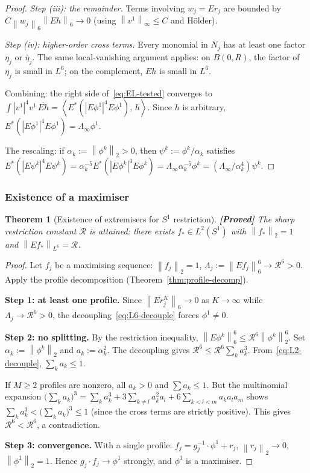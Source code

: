 \documentclass[12pt]{article}
\newtheorem{theorem}{Theorem}[section]
\theoremstyle{definition}
\theoremstyle{remark}
\newcommand{\norm}[1]{\left\|#1\right\|}
\newcommand{\ip}[2]{\left\langle #1,\, #2\right\rangle}
\newcommand{\proven}{\textbf{\color{teal}[Proved]}}
\begin{document}
\begin{proof}
  \emph{Step (iii): the remainder.}
  Terms involving $w_j=Er_j$ are bounded by
  $C\norm{w_j}_6^{}\norm{Eh}_6\to 0$ (using
  $\norm{v^1}_\infty\leq C$ and H\"older).

  \emph{Step (iv): higher-order cross terms.}
  Every monomial in $N_j$ has at least one factor $\eta_j$ or
  $\bar\eta_j$.  The same local-vanishing argument applies: on
  $B(0,R)$, the factor of $\eta_j$ is small in $L^6$; on the
  complement, $Eh$ is small in $L^6$.

  \medskip
  Combining: the right side of~\eqref{eq:EL-tested} converges to
  $\int|v^1|^4v^1\,\overline{Eh}
  =\ip{E^*(|E\phi^1|^4E\phi^1)}{h}$.
  Since $h$ is arbitrary,
  $E^*(|E\phi^1|^4E\phi^1)=\Lambda_\infty\phi^1$.

  The rescaling: if $\alpha_k:=\norm{\phi^k}_2>0$, then
  $\psi^k:=\phi^k/\alpha_k$ satisfies
  $E^*(|E\psi^k|^4E\psi^k)
  =\alpha_k^{-5}E^*(|E\phi^k|^4E\phi^k)
  =\Lambda_\infty\alpha_k^{-5}\phi^k
  =(\Lambda_\infty/\alpha_k^4)\psi^k$.
\end{proof}

\subsubsection{Existence of a maximiser}

\begin{theorem}[Existence of extremisers for $S^1$ restriction]
  \label{thm:maximiser}
  \proven\quad
  The sharp restriction constant $\mathcal R$ is attained: there exists
  $f_*\in L^2(S^1)$ with $\norm{f_*}_2=1$ and
  $\norm{Ef_*}_{L^6}=\mathcal R$.
\end{theorem}

\begin{proof}
  Let $f_j$ be a maximising sequence: $\norm{f_j}_2=1$,
  $\Lambda_j:=\norm{Ef_j}_6^6\to\mathcal R^6>0$.  Apply the profile
  decomposition (Theorem~\ref{thm:profile-decomp}).

  \textbf{Step 1: at least one profile.}
  Since $\norm{Er_j^K}_6\to 0$ as $K\to\infty$ while
  $\Lambda_j\to\mathcal R^6>0$, the
  decoupling~\eqref{eq:L6-decouple} forces $\phi^1\neq 0$.

  \textbf{Step 2: no splitting.}
  By the restriction inequality, $\norm{E\phi^k}_6^6
  \leq\mathcal R^6\norm{\phi^k}_2^6$.  Set $\alpha_k:=\norm{\phi^k}_2$
  and $a_k:=\alpha_k^2$.  The decoupling gives
  $\mathcal R^6\leq\mathcal R^6\sum_{k}a_k^3$.
  From~\eqref{eq:L2-decouple}, $\sum_k a_k\leq 1$.

  If $M\geq 2$ profiles are nonzero, all $a_k>0$ and $\sum a_k\leq 1$.
  But the multinomial expansion
  $\bigl(\sum_k a_k\bigr)^3
  =\sum_k a_k^3+3\sum_{k\neq l}a_k^2a_l+6\sum_{k<l<m}a_ka_la_m$
  shows $\sum_k a_k^3<\bigl(\sum_k a_k\bigr)^3\leq 1$ (since the
  cross terms are strictly positive).  This gives
  $\mathcal R^6<\mathcal R^6$, a contradiction.

  \textbf{Step 3: convergence.}
  With a single profile: $f_j=g_j^{-1}\cdot\phi^1+r_j$,
  $\norm{r_j}_2\to 0$, $\norm{\phi^1}_2=1$.  Hence
  $g_j\cdot f_j\to\phi^1$ strongly, and $\phi^1$ is a maximiser.
\end{proof}
\end{document}
